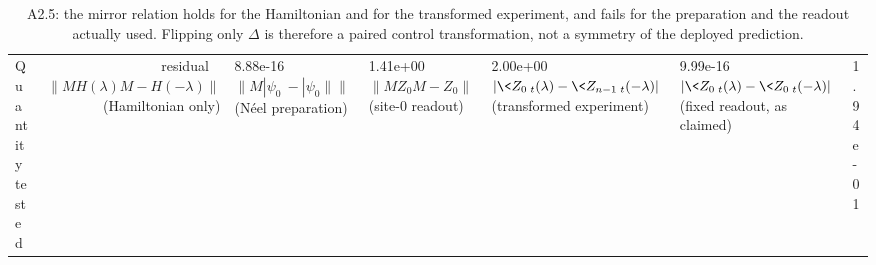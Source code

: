 \begin{table}[h]\centering\small
\begin{tabular}{lr}
\toprule
Quantity tested & residual \
\midrule
$\|M H(\lambda) M - H(-\lambda)\|$ (Hamiltonian only) & 8.88e-16 \
$\|M|\psi_0\> - |\psi_0\|\|$ (N\'eel preparation) & 1.41e+00 \
$\|M Z_0 M - Z_0\|$ (site-0 readout) & 2.00e+00 \
$|\<Z_0\>_t(\lambda) - \<Z_{n-1}\>_t(-\lambda)|$ (transformed experiment) & 9.99e-16 \
$|\<Z_0\>_t(\lambda) - \<Z_0\>_t(-\lambda)|$ (fixed readout, as claimed) & 1.94e-01 \
\bottomrule\end{tabular}
\caption{A2.5: the mirror relation holds for the Hamiltonian and for the transformed experiment, and fails for the preparation and the readout actually used. Flipping only $\Delta$ is therefore a paired control transformation, not a symmetry of the deployed prediction.}
\label{tab:mirror}
\end{table}
